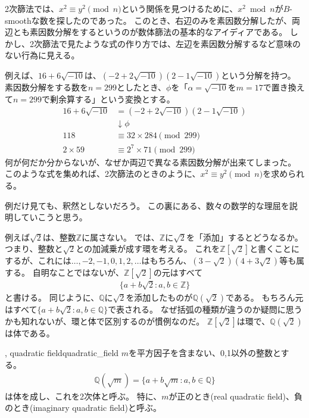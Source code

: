 2次篩法では、$x^2\equiv y^2 \pmod{n}$という関係を見つけるために、$x^2\bmod{n}$が$B$-smoothな数を探したのであった。
このとき、右辺のみを素因数分解したが、両辺とも素因数分解をするというのが数体篩法の基本的なアイディアである。
しかし、2次篩法で見たような式の作り方では、左辺を素因数分解するなど意味のない行為に見える。

例えば、$16 + 6\sqrt{-10}$は、$(-2+2\sqrt{-10})(2-1\sqrt{-10})$という分解を持つ。
素因数分解をする数を$n=299$としたとき、$\phi$を「$\alpha=\sqrt{-10}$を$m=17$で置き換えて$n=299$で剰余算する」という変換とする。
\begin{align*}
16 + 6\sqrt{-10} &= (-2+2\sqrt{-10})(2-1\sqrt{-10})\\
&\downarrow \phi \\
118 &\equiv 32 \times 284\pmod{299}\\
2 \times 59 &\equiv 2^7 \times 71 \pmod{299}
\end{align*}
何が何だか分からないが、なぜか両辺で異なる素因数分解が出来てしまった。
このような式を集めれば、2次篩法のときのように、$x^2\equiv y^2 \pmod{n}$を求められる。

例だけ見ても、釈然としないだろう。
この裏にある、数々の数学的な理屈を説明していこうと思う。

例えば$\sqrt{2}$は、整数$\mathbb{Z}$に属さない。
では、$\mathbb{Z}$に$\sqrt{2}$を「添加」するとどうなるか。
つまり、整数と$\sqrt{2}$との加減乗が成す環を考える。
これを$\mathbb{Z}[\sqrt{2}]$と書くことにするが、これには$\ldots,-2,-1,0,1,2,\ldots$はもちろん、$(3-\sqrt{2})(4+3\sqrt{2})$等も属する。
自明なことではないが、$\mathbb{Z}[\sqrt{2}]$の元はすべて
\begin{align*}
\{ a + b\sqrt{2} : a, b \in \mathbb{Z}\}
\end{align*}
と書ける。
同じように、$\mathbb{Q}$に$\sqrt{2}$を添加したものが$\mathbb{Q}(\sqrt{2})$である。
もちろん元はすべて$\{ a + b\sqrt{2} : a, b \in \mathbb{Q}\}$で表される。
なぜ括弧の種類が違うのか疑問に思うかも知れないが、環と体で区別するのが慣例なのだ。
$\mathbb{Z}[\sqrt{2}]$は環で、$\mathbb{Q}(\sqrt{2})$は体である。

\begin{Defi}{, quadratic field}{quadratic_field}
$m$を平方因子を含まない、0,1以外の整数とする。
\begin{align*}
\mathbb{Q}(\sqrt{m}) = \{a + b\sqrt{m} : a,b \in\mathbb{Q}\}
\end{align*}
は体を成し、これを2次体と呼ぶ。
特に、$m$が正のとき(real quadratic field)、負のとき(imaginary quadratic field)と呼ぶ。
\end{Defi}

